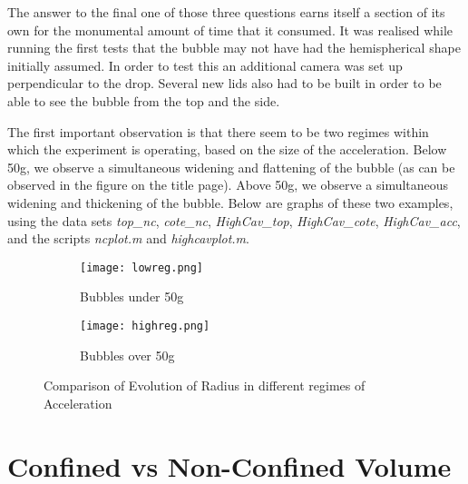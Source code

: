 \documentclass{article}
\begin{document}
The answer to the final one of those three questions earns itself a section of its own for the monumental amount of time that it consumed. It was realised while running the first tests that the bubble may not have had the hemispherical shape initially assumed. In order to test this an additional camera was set up perpendicular to the drop. Several new lids also had to be built in order to be able to see the bubble from the top and the side. 

The first important observation is that there seem to be two regimes within which the experiment is operating, based on the size of the acceleration. Below 50g, we observe a simultaneous widening and flattening of the bubble (as can be observed in the figure on the title page). Above 50g, we observe a simultaneous widening and thickening of the bubble. Below are graphs of these two examples, using the data sets \emph{top\_nc}, \emph{cote\_nc}, \emph{HighCav\_top}, \emph{HighCav\_cote}, \emph{HighCav\_acc}, and the scripts \emph{ncplot.m} and \emph{highcavplot.m}.
\begin{figure}[H]
  \centering
  \begin{subfigure}[b]{0.49\linewidth}
    \texttt{[image: lowreg.png]}
    \caption{Bubbles under 50g}
  \end{subfigure}
  \begin{subfigure}[b]{0.49\linewidth}
    \texttt{[image: highreg.png]}
    \caption{Bubbles over 50g}
  \end{subfigure}
  \caption{Comparison of Evolution of Radius in different regimes of Acceleration}
\end{figure}

\section{Confined vs Non-Confined Volume}
\end{document}
